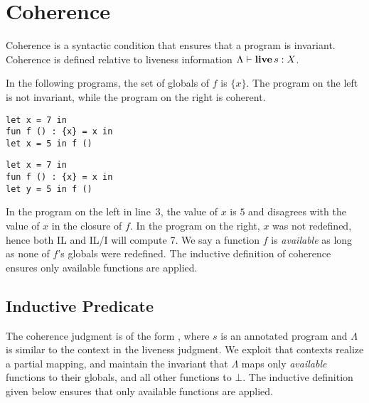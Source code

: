 \documentclass[openright,a4paper,11pt]{scrartcl}
\newcommand{\set}[1]{\ensuremath{\{#1\}}}
\newcommand{\LT}{\ensuremath{\Lambda}}
\newcommand{\LC}{\ensuremath{\Lambda}}
\newcommand{\lv}{\ensuremath{X}}
\newcommand{\coh}[3]{\ensuremath{#1~\vdash\textbf{\textup{coh}}~{}#3}}
\newcommand{\lives}[3]{\ensuremath{#1\vdash\textbf{\textup{live}}\,{}#3:#2}}
\theoremstyle{plain}
\theoremstyle{plain}
\theoremstyle{plain}
\theoremstyle{plain}
\theoremstyle{nonumberplain}
\begin{document}
\section{Coherence}
\label{chap:invariance}
\label{sec:coherence}
Coherence is a syntactic condition that ensures that a program is invariant.
Coherence is defined relative to liveness information $\lives{\LC}{\lv}{s}$.

In the following programs, the set of globals of $f$ is \set{x}.
The program on the left is not invariant, while the program on the right is coherent.
\begin{center}
\begin{minipage}{.45\textwidth}
\begin{lstlisting}[label=lst:diff_sem,caption={}]
let x = 7 in
fun f () : {x} = x in
let x = 5 in f ()
\end{lstlisting}
\end{minipage}
\begin{minipage}{.45\textwidth}
\begin{lstlisting}[label=lst:invariant,caption={}]
let x = 7 in
fun f () : {x} = x in
let y = 5 in f ()
\end{lstlisting}
\end{minipage}
\end{center}
In the program on the left in line~3, the value of $x$ is $5$ and disagrees with the value of $x$ in the closure of $f$.
In the program on the right, $x$ was not redefined, hence both IL and IL/I will compute 7.
We say a function $f$ is \emph{available} as long as none of $f$'s globals were redefined.
The inductive definition of coherence ensures only available functions are applied.




\subsection{Inductive Predicate}
The coherence judgment is of the form \fbox{$\coh{\LT}{a}{s}$}, where
$s$ is an annotated program and
$\LT$ is similar to the context in the liveness judgment.
We exploit that contexts realize a partial mapping,
and maintain the invariant that $\LT$
maps only \emph{available} functions to their globals, and all other functions to $\bot$.
The inductive definition given below ensures that only available
functions are applied.
\end{document}
